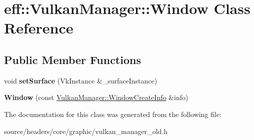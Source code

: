 \hypertarget{classeff_1_1VulkanManager_1_1Window}{}\section{eff\+:\+:Vulkan\+Manager\+:\+:Window Class Reference}
\label{classeff_1_1VulkanManager_1_1Window}
\subsection*{Public Member Functions}
\begin{DoxyCompactItemize}
\item 
\mbox{\label{classeff_1_1VulkanManager_1_1Window_a2a472abd234d54d18e3110b61a664fcc}} 
void {\bfseries set\+Surface} (Vk\+Instance \&\+\_\+surface\+Instance)
\item 
\mbox{\label{classeff_1_1VulkanManager_1_1Window_a35509a5a45b164b0bffcdc8a76501b7e}} 
{\bfseries Window} (const \mbox{\hyperlink{structeff_1_1VulkanManager_1_1WindowCreateInfo}{Vulkan\+Manager\+::\+Window\+Create\+Info}} \&info)
\end{DoxyCompactItemize}


The documentation for this class was generated from the following file\+:\begin{DoxyCompactItemize}
\item 
source/headers/core/graphic/vulkan\+\_\+manager\+\_\+old.\+h\end{DoxyCompactItemize}
